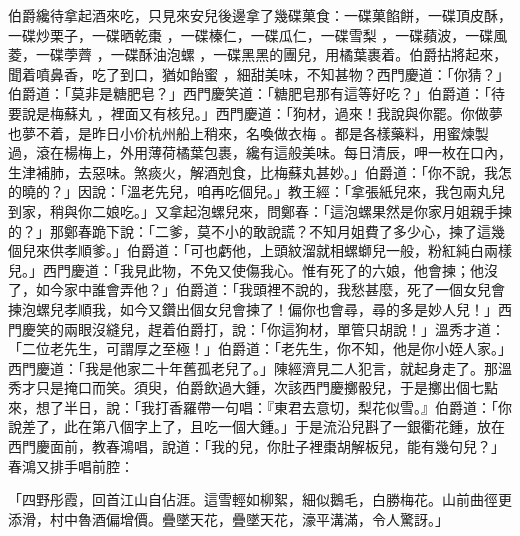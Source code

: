 伯爵纔待拿起酒來吃，只見來安兒後邊拿了幾碟菓食：一碟菓餡餅，一碟頂皮酥，一碟炒栗子，一碟晒乾棗 ，一碟榛仁，一碟瓜仁，一碟雪梨 ，一碟蘋波，一碟風菱，一碟荸薺 ，一碟酥油泡螺 ，一碟黑黑的團兒，用橘葉裹着。伯爵拈將起來，聞着噴鼻香，吃了到口，猶如飴蜜 ，細甜美味，不知甚物？西門慶道：「你猜？」伯爵道：「莫非是糖肥皂？」西門慶笑道：「糖肥皂那有這等好吃？」伯爵道：「待要說是梅蘇丸 ，裡面又有核兒。」西門慶道：「狗材，過來！我說與你罷。你做夢也夢不着，是昨日小价杭州船上稍來，名喚做衣梅 。都是各樣藥料，用蜜煉製過，滾在楊梅上，外用薄荷橘葉包裹，纔有這般美味。每日清辰，呷一枚在口內，生津補肺，去惡味。煞痰火，解酒剋食，比梅蘇丸甚妙。」伯爵道：「你不說，我怎的曉的？」因說：「溫老先兒，咱再吃個兒。」教王經：「拿張紙兒來，我包兩丸兒到家，稍與你二娘吃。」又拿起泡螺兒來，問鄭春：「這泡螺果然是你家月姐親手揀的？」那鄭春跪下說：「二爹，莫不小的敢說謊？不知月姐費了多少心，揀了這幾個兒來供孝順爹。」伯爵道：「可也虧他，上頭紋溜就相螺螄兒一般，粉紅純白兩樣兒。」西門慶道：「我見此物，不免又使傷我心。惟有死了的六娘，他會揀；他沒了，如今家中誰會弄他？」伯爵道：「我頭裡不說的，我愁甚麼，死了一個女兒會揀泡螺兒孝順我，如今又鑽出個女兒會揀了！偏你也會尋，尋的多是妙人兒！」西門慶笑的兩眼沒縫兒，趕着伯爵打，說：「你這狗材，單管只胡說！」溫秀才道：「二位老先生，可謂厚之至極！」伯爵道：「老先生，你不知，他是你小姪人家。」西門慶道：「我是他家二十年舊孤老兒了。」陳經濟見二人犯言，就起身走了。那溫秀才只是掩口而笑。須臾，伯爵飲過大鍾，次該西門慶擲骰兒，于是擲出個七點來，想了半日，說：「我打香羅帶一句唱：『東君去意切，梨花似雪。』伯爵道：「你說差了，此在第八個字上了，且吃一個大鍾。」于是流沿兒斟了一銀衢花鍾，放在西門慶面前，教春鴻唱，說道：「我的兒，你肚子裡棗胡解板兒，能有幾句兒？」春鴻又排手唱前腔：

「四野彤霞，回首江山自佔涯。這雪輕如柳絮，細似鵝毛，白勝梅花。山前曲徑更添滑，村中魯酒偏增價。疊墜天花，疊墜天花，濠平溝滿，令人驚訝。」

